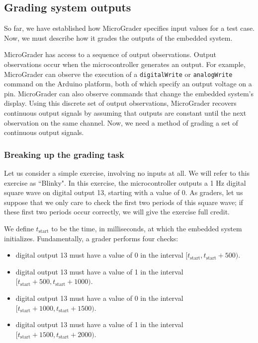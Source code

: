 \documentclass[12pt]{article}
\begin{document}
\subsection{Grading system outputs}
\label{sec:eval-point}
So far, we have established how MicroGrader specifies input values for a test case.  Now, we must describe how it grades the outputs of the embedded system.

MicroGrader has access to a sequence of output observations.  Output observations occur when the microcontroller generates an output.  For example, MicroGrader can observe the execution of a \texttt{digitalWrite} or \texttt{analogWrite} command on the Arduino platform, both of which specify an output voltage on a pin.  MicroGrader can also observe commands that change the embedded system's display.  Using this discrete set of output observations, MicroGrader recovers continuous output signals by assuming that outputs are constant until the next observation on the same channel.  Now, we need a method of grading a set of continuous output signals.


\subsubsection{Breaking up the grading task}
Let us consider a simple exercise, involving no inputs at all.  We will refer to this exercise as ``Blinky".  In this exercise, the microcontroller outputs a 1 Hz digital square wave on digital output 13, starting with a value of 0.  As graders, let us suppose that we only care to check the first two periods of this square wave; if these first two periods occur correctly, we will give the exercise full credit.

We define $t_{\text{start}}$ to be the time, in milliseconds, at which the embedded system initializes.  Fundamentally, a grader performs four checks:

\begin{itemize}
\item digital output 13 must have a value of 0 in the interval $[t_{\text{start}},t_{\text{start}}+500)$.
\item digital output 13 must have a value of 1 in the interval $[t_{\text{start}}+500,t_{\text{start}}+1000)$.
\item digital output 13 must have a value of 0 in the interval $[t_{\text{start}}+1000,t_{\text{start}}+1500)$.
\item digital output 13 must have a value of 1 in the interval $[t_{\text{start}}+1500,t_{\text{start}}+2000)$.
\end{itemize}
\end{document}
